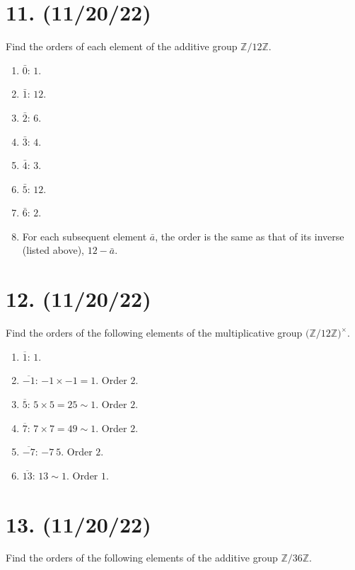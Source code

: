 \documentclass{article}
\begin{document}
\section*{11. (11/20/22)}

Find the orders of each element of the additive group $\mathbb{Z}/12\mathbb{Z}$.

\begin{enumerate}[label=$\ast$]
      \item $\bar{0}$: $1$.
      \item $\bar{1}$: $12$.
      \item $\bar{2}$: $6$.
      \item $\bar{3}$: $4$.
      \item $\bar{4}$: $3$.
      \item $\bar{5}$: $12$.
      \item $\bar{6}$: $2$.
      \item For each subsequent element $\bar{a}$, the order is the same as that of its inverse (listed above), $12 - \bar{a}$.
\end{enumerate}

\section*{12. (11/20/22)}

Find the orders of the following elements of the multiplicative group $\bigl(\mathbb{Z}/12\mathbb{Z}\bigr)^\times$.

\begin{enumerate}[label=$\ast$]
      \item $\overline{1}$: $1$.
      \item $\overline{-1}$: $-1 \times -1 = 1$. Order $2$.
      \item $\overline{5}$: $5 \times 5 = 25 \sim 1$. Order $2$.
      \item $\overline{7}$: $7 \times 7 = 49 \sim 1$. Order $2$.
      \item $\overline{-7}$: $-7 ~ 5$. Order $2$.
      \item $\overline{13}$: $13 \sim 1$. Order $1$.
\end{enumerate}

\section*{13. (11/20/22)}

Find the orders of the following elements of the additive group $\mathbb{Z}/36\mathbb{Z}$.
\end{document}
